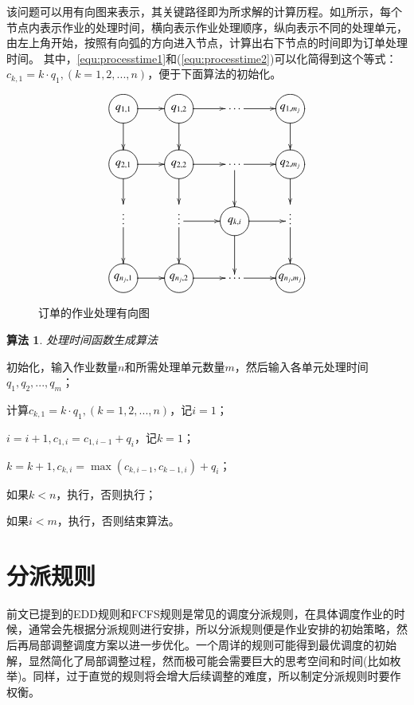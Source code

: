 该问题可以用有向图来表示，其关键路径即为所求解的计算历程。如\ref{fig:directedgraph}所示，每个节点内表示作业的处理时间，横向表示作业处理顺序，纵向表示不同的处理单元，由左上角开始，按照有向弧的方向进入节点，计算出右下节点的时间即为订单处理时间。
其中，\eqref{equ:processtime1}和(\ref{equ:processtime2})可以化简得到这个等式：$c_{k,1} = k\cdot q_1,(k = 1,2,...,n)$，便于下面算法的初始化。
\begin{figure}[h]
\newcommand{\process}[1]{*++=[o][F]{\makebox[2em]{$#1$}}}
\begin{equation*}
\xymatrix{
\process{q_{1,1}} \ar[r] \ar[d] & \process{q_{1,2}} \ar[d] \ar[r] & \cdots\ar[r] & \process{q_{1,m_j}} \ar[d]\\
\process{q_{2,1}} \ar[r]\ar[d] & \process{q_{2,2}} \ar[d]\ar[r] & \cdots \ar[r] \ar[d]& \process{q_{2,m_j}} \ar[d] \\
\vdots\ar[d] & \vdots \ar[d]\ar[r] & \process{q_{k,i}}\ar[r]\ar[d] &\vdots \ar[d]\\
\process{q_{n_j,1}} \ar[r] & \process{q_{n_j,2}} \ar[r] & \cdots\ar[r] & \process{q_{n_j,m_j}}
}
\end{equation*}
\caption{订单的作业处理有向图\label{fig:directedgraph}}
\end{figure}

\theoremheaderfont{\heiti}
\newtheorem{algori}[algor]{算法}%
\begin{algori}
处理时间函数生成算法
\end{algori}

\begin{asparaenum}
\renewcommand{\labelenumi}{\bf Step\theenumi~}
\item 初始化，输入作业数量$n$和所需处理单元数量$m$，然后输入各单元处理时间$q_1,q_2,...,q_m$；
\item 计算$c_{k,1} = k\cdot q_1,(k = 1,2,...,n)$，记$i = 1$；
\item $i = i + 1, c_{1,i} = c_{1,i-1} + q_i$，记$k = 1$；
\item $k = k + 1, c_{k,i} = \max(c_{k,i-1}, c_{k-1,i}) + q_i$；
\item 如果$k<n$，执行，否则执行；
\item 如果$i<m$，执行，否则结束算法。
\end{asparaenum}

\section{分派规则}
前文已提到的EDD规则和FCFS规则是常见的调度分派规则，在具体调度作业的时候，通常会先根据分派规则进行安排，所以分派规则便是作业安排的初始策略，然后再局部调整调度方案以进一步优化。一个周详的规则可能得到最优调度的初始解，显然简化了局部调整过程，然而极可能会需要巨大的思考空间和时间(比如枚举)。同样，过于直觉的规则将会增大后续调整的难度，所以制定分派规则时要作权衡。
